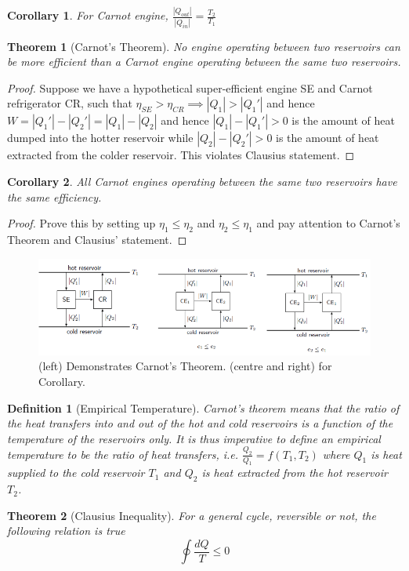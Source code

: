 \documentclass[a4paper]{article}
\theoremstyle{new}
\newtheorem{defi}{Definition}[section]
\newtheorem{thm}{Theorem}[section]
\newtheorem{cor}{Corollary}[section]
\begin{document}
\begin{cor}
For Carnot engine, $\frac{|Q_{out}|}{|Q_{in}|}=\frac{T_2}{T_1}$
\end{cor}
\begin{thm}[Carnot's Theorem]
No engine operating between two reservoirs can be more efficient than a Carnot engine operating between the same two reservoirs.
\end{thm}
\begin{proof}
Suppose we have a hypothetical super-efficient engine SE and Carnot refrigerator CR, such that $\eta_{SE}>\eta_{CR}\implies|Q_1|>|Q_1'|$ and hence $W=|Q_1'|-|Q_2'|=|Q_1|-|Q_2|$ and hence $|Q_1|-|Q_1'|>0$ is the amount of heat dumped into the hotter reservoir while $|Q_2|-|Q_2'|>0$ is the amount of heat extracted from the colder reservoir. This violates Clausius statement.
\end{proof}
\begin{cor}
All Carnot engines operating between the same two reservoirs have the same efficiency.
\end{cor}
\begin{proof}
Prove this by setting up $\eta_1\leq\eta_2$ and $\eta_2\leq\eta_1$ and pay attention to Carnot's Theorem and Clausius' statement.
\end{proof}
\begin{figure}[H]
    \centering
    \includegraphics[scale=0.7]{secondlaw3.PNG}
    \caption{(left) Demonstrates Carnot's Theorem. (centre and right) for Corollary. \cite{blundell2010concepts}}
\end{figure}
\begin{defi}[Empirical Temperature]
Carnot's theorem means that the ratio of the heat transfers into and out of the hot and cold reservoirs is a function of the temperature of the reservoirs only. It is thus imperative to define an empirical temperature to be the ratio of heat transfers, i.e. $\frac{Q_2}{Q_1}=f(T_1,T_2)$ where $Q_1$ is heat supplied to the cold reservoir $T_1$ and $Q_2$ is heat extracted from the hot reservoir $T_2$.
\end{defi}
\begin{thm}[Clausius Inequality]
For a general cycle, reversible or not, the following relation is true
\begin{equation}
\oint\frac{dQ}{T}\leq 0\label{Clausius}
\end{equation}
\end{thm}
\end{document}
